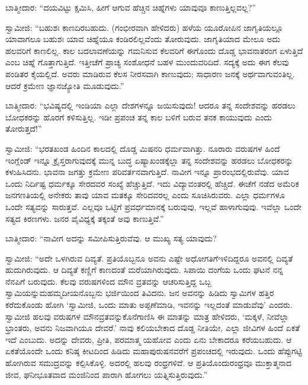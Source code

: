 \vskip 0.1cm

ಬಾತ್ಮೀದಾರ: “ದಯವಿಟ್ಟು ಕ್ಷಮಿಸಿ, ಹೀಗೆ ಆಗುವ ಹೆಚ್ಚಿನ ಚಿಹ್ನೆಗಳು ಯಾವುವೂ ಕಾಣುತ್ತಿಲ್ಲವಲ್ಲ?”

\vskip 0.1cm

ಸ್ವಾಮೀಜಿ: “ಬಹುಶಃ ಕಾಣದಿರಬಹುದು. (ಗಂಭೀರವಾಗಿ ಹೇಳಿದರು) ಹಳೆಯ ಯೂರೋಪಿನ ಜಾಗೃತಿಯಲ್ಲೂ ಯಾವಾಗಲೂ ಬಹುಶಃ ಯಾವ ಚಿಹ್ನೆಯೂ ಕಂಡಿರಲಿಲ್ಲ\-ವೆಂದು ತೋರುವುದು. ಜಾಗೃತಿಯಾದ ಮೇಲೂ ಅದು ಹಲವರಿಗೆ ಕಾಣಲಿಲ್ಲ. ಕಾಲ ಬದಲಾವಣೆಯನ್ನು ಗಮನಿಸುವ ಕೆಲವರಿಗೆ ಈಗೊಂದು ದೊಡ್ಡ ಭಾವನಾತರಂಗ ಏಳುತ್ತಿದೆ ಎಂಬ ಚಿಹ್ನೆ ಗೊತ್ತಾಗುತ್ತಿದೆ. ಇತ್ತೀಚೆಗೆ ಪ್ರಾಚ್ಯ ಸಂಶೋಧನೆ ಬಹಳ ಮುಂದುವರಿದಿದೆ. ಸದ್ಯಕ್ಕೆ ಅದು ಈಗ ಕೆಲವು ಪಂಡಿತರ ಕೈಯಲ್ಲಿದೆ. ಅವರು ಮಾಡಿರುವ ಕೆಲಸ ನೀರಸವಾಗಿ ಕಾಣುವುದು; ಸಾಧಾರಣ ಜನಕ್ಕೆ ಅರ್ಥವಾಗುವಂತಿಲ್ಲ. ಆದರೆ ಕ್ರಮೇಣ ಜ್ಞಾನಜ್ಯೋತಿ ಮೂಡುವುದು.”

ಬಾತ್ಮೀದಾರ: “ಭವಿಷ್ಯದಲ್ಲಿ ಇಂಡಿಯಾ ಎಲ್ಲಾ ದೇಶಗಳನ್ನೂ ಜಯಿಸುವುದು! ಆದರೂ ತನ್ನ ಸಂದೇಶವನ್ನು ಹರಡಲು ಬೋಧಕರನ್ನು ಹೊರಗೆ ಕಳಿಸುತ್ತಿಲ್ಲ. ಇಡೀ ಪ್ರಪಂಚ ತನ್ನ ಕಾಲ ಬಳಿಗೆ ಬರುವ ತನಕ ಕಾಯುವುದು ಎಂದು ತೋರುತ್ತದೆ!”

\vskip 0.1cm

ಸ್ವಾಮೀಜಿ: “ಭರತಖಂಡ ಹಿಂದಿನ ಕಾಲದಲ್ಲಿ ದೊಡ್ಡ ಮಿಷನರಿ ಧರ್ಮವಾಗಿತ್ತು. ನೂರಾರು ವರುಷಗಳ ಹಿಂದೆ ಇಂಗ್ಲೆಂಡ್​ ಇನ್ನೂ ಕ್ರೈಸ್ತರಾಗುವುದಕ್ಕೆ ಮುನ್ನ ಬುದ್ಧ ಏಷ್ಯಾಖಂಡಕ್ಕೆಲ್ಲಾ ತನ್ನ ಸಂದೇಶವನ್ನು ಹರಡಲು ಬೋಧಕರನ್ನು ಕಳುಹಿಸಿದನು. ಭಾವನಾ ಜಗತ್ತು ಕ್ರಮೇಣ ಪರಿವರ್ತನವಾಗುತ್ತಿದೆ. ನಾವೀಗ ಇನ್ನೂ ಪ್ರಾರಂಭದಲ್ಲಿರುವೆವು. ಯಾವ ಒಂದು ನಿರ್ದಿಷ್ಟ ಧರ್ಮಕ್ಕೂ ಸೇರದವರ ಸಂಖ್ಯೆ ಹೆಚ್ಚುತ್ತಿದೆ. ಇದು ವಿದ್ಯಾವಂತರಲ್ಲಿ ಹೆಚ್ಚಿದೆ. ಈಚೆಗೆ ನಡೆದ ಅಮೆರಿಕ ಜನಗಣತಿಯಲ್ಲಿ ಅನೇಕರು ತಾವು ಯಾವ ಮತಕ್ಕೂ ಸೇರಿದವರಲ್ಲ ಎಂದು ಸೂಚಿಸಿರುವರು. ಎಲ್ಲಾ ಧರ್ಮಗಳೂ ಒಂದೇ ಸತ್ಯವನ್ನು ಸಾರುತ್ತವೆ. ಎಲ್ಲವೂ ಒಟ್ಟಿಗೆ ಪ್ರವರ್ಧಮಾನಕ್ಕೆ ಬರುವುವು, ಇಲ್ಲವೆ ಹಾಳಾಗುವುವು. ಇವೆಲ್ಲಾ ಒಂದೇ ಸತ್ಯದ ಕಿರಣಗಳು. ಜನರ ವೈವಿಧ್ಯಕ್ಕೆ ತಕ್ಕಂತೆ ಅವು ಕಾಣುತ್ತಿವೆ.”

\vskip 0.1cm

ಬಾತ್ಮೀದಾರ: “ನಾವೀಗ ಅದನ್ನು ಸಮೀಪಿಸುತ್ತಿರುವೆವು. ಆ ಮುಖ್ಯ ಸತ್ಯ ಯಾವುದು?

\vskip 0.1cm

ಸ್ವಾಮೀಜಿ: “ಅದೇ ಒಳಗಿರುವ ದಿವ್ಯತೆ. ಪ್ರತಿಯೊಬ್ಬನೂ ಅವನು ಎಷ್ಟೇ ಅಧೋಗತಿಗೆ\break ಇಳಿದಿದ್ದರೂ ಅವನಲ್ಲಿ ದಿವ್ಯತೆ ಹುದುಗಿರುವುದು. ಆ ದಿವ್ಯತೆ ಕಣ್ಣಿಗೆ ಕಾಣದಂತೆ ಮರೆಯಾಗಿರು\-ವುದು. ಸಿಪಾಯಿ ದಂಗೆಯ ಒಂದು ಘಟನೆ ನನ್ನ ನೆನಪಿಗೆ ಬರುವುದು. ಕೆಲವು ವರುಷಗಳಿಂದ ಮೌನ ವ್ರತವನ್ನು ಆಚರಿಸುತ್ತಿದ್ದ ಒಬ್ಬ ಸ್ವಾಮಿಯನ್ನು\break ಮಹಮ್ಮದೀಯನೊಬ್ಬನು ಭರ್ಜಿಯಿಂದ ತಿವಿದನು. ಜನ ಅವನನ್ನು ಹಿಡಿದು ಸ್ವಾಮಿಗಳ ಹತ್ತಿರ ಕರೆದುಕೊಂಡು ಹೋಗಿ ‘ಸ್ವಾಮೀಜಿ, ಒಂದು ಮಾತು ಅಪ್ಪಣೆಮಾಡಿ, ಇವನನ್ನು ಇಲ್ಲದಂತೆ ಮಾಡುವೆವು’ ಎಂದರು. ಸ್ವಾಮೀಜಿ ಹಲವು ವರುಷಗಳ ಮೌನವ್ರತವನ್ನು\break ಕೊನೆಗಾಣಿಸಿ ಈ ಮಾತನ್ನು ಮಾತ್ರ ಹೇಳಿದರು, ‘ಮಕ್ಕಳೆ, ನೀವೆಲ್ಲಾ ಭ್ರಾಂತರು, ಅವನು ನಿಜವಾಗಿಯೂ ದೇವರೆ.’ ನಾವು ಕಲಿಯಬೇಕಾದ ದೊಡ್ಡ ನೀತಿಯೇ, ಎಲ್ಲಾ ಜೀವಿಗಳ ಹಿಂದೆ ಏಕತೆ ಇದೆ ಎಂಬುದು. ಅದನ್ನು ದೇವರು, ಪ್ರೀತಿ, ಪರಮಾತ್ಮ ಯಹೋವ ಎಂದು ಏನು ಬೇಕಾದರೂ ಕರೆಯಬಹುದು. ಆ ಏಕತೆಯೊಂದೇ ಒಂದು ಕನಿಷ್ಠ ಕೀಟದಿಂದ ಹಿಡಿದು ಮಹಾಪುರುಷನವರೆಗೆ ಪ್ರಪಂಚದಲ್ಲಿ ಇರುವುದು. ಒಂದು ಹೆಪ್ಪುಗಟ್ಟಿ ಹೋಗಿ\-ರುವ ಸಮುದ್ರವನ್ನು ಕಲ್ಪಿಸಿಕೊಳ್ಳಿ. ಅದರಲ್ಲಿ ಹಲವು ರಂಧ್ರಗಳಿವೆ. ಆ ಪ್ರತಿಯೊಂದು\break ರಂಧ್ರವೂ ಮುಕ್ತಾತ್ಮನಾದ ಜೀವ, ಘನೀಭೂತವಾದ ಮಂಜಿನಿಂದ ಪಾರಾಗಿ ಹೋಗಲು ಯತ್ನಿಸುತ್ತಿರುವುದು.”

